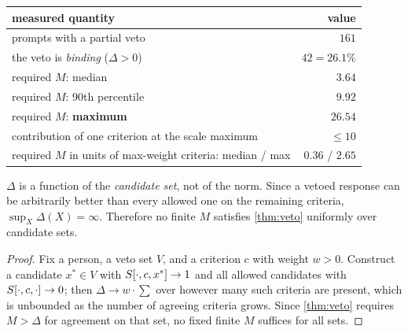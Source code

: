 \begin{table}[H]\centering\small
\begin{tabular}{lr}
\toprule
measured quantity & value\\
\midrule
prompts with a partial veto & $161$\\
the veto is \emph{binding} ($\Delta > 0$) & $42 = 26.1\%$\\
required $M$: median & $3.64$\\
required $M$: 90th percentile & $9.92$\\
required $M$: \textbf{maximum} & $\mathbf{26.54}$\\
contribution of one criterion at the scale maximum & $\le 10$\\
required $M$ in units of max-weight criteria: median / max & $0.36$ / $\mathbf{2.65}$\\
\bottomrule
\end{tabular}
\label{tab:vetoM}
\end{table}

\begin{theorem}
\label{thm:vetoinf}
$\Delta$ is a function of the \emph{candidate set}, not of the norm. Since a
vetoed response can be arbitrarily better than every allowed one on the remaining
criteria, $\sup_X \Delta(X) = \infty$. Therefore no finite $M$ satisfies
\cref{thm:veto} uniformly over candidate sets.
\end{theorem}
\begin{proof}
Fix a person, a veto set $V$, and a criterion $c$ with weight $w>0$. Construct a
candidate $x^\ast \in V$ with $S[\cdot,c,x^\ast] \to 1$ and all allowed
candidates with $S[\cdot,c,\cdot] \to 0$; then $\Delta \to w \cdot \sum$ over
however many such criteria are present, which is unbounded as the number of
agreeing criteria grows. Since \cref{thm:veto} requires $M>\Delta$ for agreement
on that set, no fixed finite $M$ suffices for all sets.
\end{proof}



